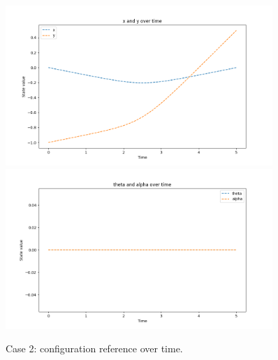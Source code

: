 \begin{figure}[H]
  \centering
  \includegraphics[width=0.9\textwidth]{pictures/Figure_1_velocita_smooth}\hfill\\
  \includegraphics[width=0.9\textwidth]{pictures/Figure_2_velocita_smooth}\hfill
  \caption{Case 2: configuration reference over time.}
  \label{fig:Reference trajectory}
\end{figure}

